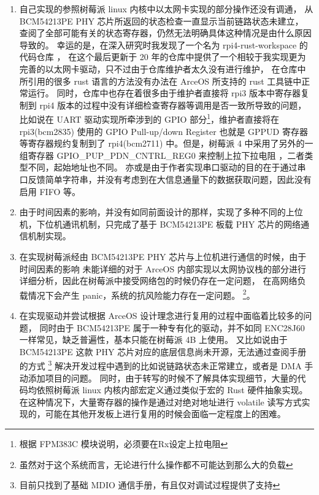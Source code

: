     \begin{enumerate}
        \item 自己实现的参照树莓派 linux 内核中以太网卡实现的部分操作还没有调通，
        从 BCM54213PE PHY 芯片所返回的状态检查一直显示当前链路状态未建立，
        查阅了全部可能有关的状态寄存器，仍然无法明确具体这种情况是由什么原因导致的。
        幸运的是，在深入研究时我发现了一个名为 rpi4-rust-workspace 的代码仓库 \cite{rpi4-rust-workspace}，
        在这个最后更新于 20 年的仓库中提供了一个相较于我实现更为完善的以太网卡驱动，只不过由于仓库维护者太久没有进行维护，
        在仓库中所引用的很多 rust 语言的方法没有办法在 ArceOS 所支持的 rust 工具链中正常运行。
        同时，仓库中也存在着很多由于维护者直接将 rpi3 版本中寄存器复制到 rpi4 版本的过程中没有详细检查寄存器等调用是否一致所导致的问题，
        比如说在 UART 驱动实现所牵涉到的 GPIO 部分\footnote{根据 FPM383C 模块说明，必须要在Rx设定上拉电阻}，维护者直接将在
        rpi3(bcm2835) 使用的 GPIO Pull-up/down Register 也就是 GPPUD 寄存器等寄存器规约复制到了 rpi4(bcm2711)
        中\cite{raspberry-pi-bcm2835}。但是，树莓派 4 中采用了另外的一组寄存器 GPIO\_PUP\_PDN\_CNTRL\_REG0 来控制上拉下拉电阻
        \cite{raspberry-pi-bcm2711}，二者类型不同，起始地址也不同。
        亦或是由于作者实现串口驱动的目的在于通过串口反馈简单字符串，并没有考虑到在大信息通量下的数据获取问题，因此没有启用 FIFO 等。

        \item 由于时间因素的影响，并没有如同前面设计的那样，实现了多种不同的上位机，下位机通讯机制，只完成了基于 BCM54213PE 板载
        PHY 芯片的网络通信机制实现。

        \item 在实现树莓派经由 BCM54213PE PHY 芯片与上位机进行通信的时候，由于时间因素的影响
        未能详细的对于 ArceOS 内部实现以太网协议栈的部分进行详细分析，因此在树莓派中接受网络包的时候仍存在一定问题，
        在高网络负载情况下会产生 panic，系统的抗风险能力存在一定问题。
        \footnote{虽然对于这个系统而言，无论进行什么操作都不可能达到那么大的负载}。

        \item 在实现驱动并尝试根据 ArceOS 设计理念进行复用的过程中面临着比较多的问题，
        同时由于 BCM54213PE 属于一种专有化的驱动，并不如同 ENC28J60 一样常见，缺乏普遍性，基本只能在树莓派 4B 上使用。
        又比如说由于 BCM54213PE 这款 PHY 芯片对应的底层信息尚未开源，无法通过查阅手册的方式
        \footnote{目前只找到了基础 MDIO 通信手册，有且仅对调试过程提供了支持}
        解决开发过程中遇到的比如说链路状态未正常建立，或者是 DMA 手动添加项目的问题。
        同时，由于转写的时候不了解具体实现细节，大量的代码均依照树莓派 linux 内核内部宏定义通过类似于宏的 Rust 硬件抽象实现。
        在这种情况下，大量寄存器的操作是通过对绝对地址进行 volatile 读写方式实现的，可能在其他开发板上进行复用的时候会面临一定程度上的困难。


\end{enumerate}
